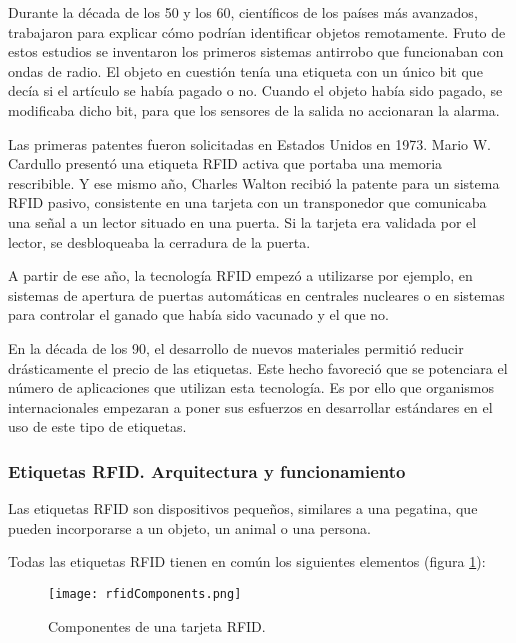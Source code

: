   Durante la década de los 50 y los 60, científicos de los países más
  avanzados, trabajaron para explicar cómo podrían identificar objetos
  remotamente. Fruto de estos estudios se inventaron los primeros sistemas
  antirrobo que funcionaban con ondas de radio. El objeto en cuestión tenía 
  una etiqueta con un único bit que decía si el artículo se había pagado o no.
  Cuando el objeto había sido pagado, se modificaba dicho bit, para que los 
  sensores de la salida no accionaran la alarma.

  Las primeras patentes fueron solicitadas en Estados Unidos en 1973. Mario W.
  Cardullo presentó una etiqueta \acs{RFID} activa que portaba una memoria
  rescribible. Y ese mismo año, Charles Walton recibió la patente para un
  sistema \ac{RFID} pasivo, consistente en una tarjeta con un transponedor que
  comunicaba una señal a un lector situado en una puerta. Si la tarjeta era
  validada por el lector, se desbloqueaba la cerradura de la puerta.

  A partir de ese año, la tecnología \acs{RFID} empezó a utilizarse por ejemplo,
  en sistemas de apertura de puertas automáticas en centrales nucleares o en
  sistemas para controlar el ganado que había sido vacunado y el que no.

  En la década de los 90, el desarrollo de nuevos materiales permitió
  reducir drásticamente el precio de las etiquetas. Este hecho favoreció
  que se potenciara el número de aplicaciones que utilizan esta tecnología.
  Es por ello que organismos internacionales empezaran a poner sus esfuerzos en
  desarrollar estándares en el uso de este tipo de etiquetas.

    \subsubsection{Etiquetas \acs{RFID}. Arquitectura y funcionamiento}
  Las etiquetas \acs{RFID} son dispositivos pequeños, similares a una pegatina,
  que pueden incorporarse a un objeto, un animal o una persona. 
  
  Todas las etiquetas \acs{RFID} tienen en común los siguientes elementos
  (figura \ref{fig:rfidComponents}):

  \begin{figure}[!h]
    \begin{center}
      \texttt{[image: rfidComponents.png]}
      \caption{Componentes de una tarjeta \acs{RFID}.}
      \label{fig:rfidComponents}
    \end{center}
  \end{figure}

